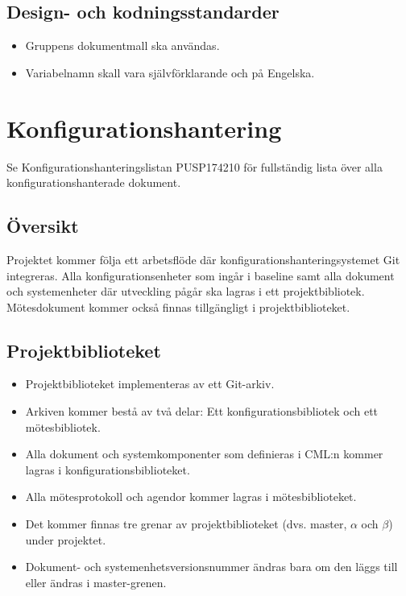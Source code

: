 \documentclass[paper=a4, fontsize=11pt,twoside]{article}
\begin{document}
\subsection*{Design- och kodningsstandarder}
	\begin{itemize}
	\item Gruppens dokumentmall ska användas.
	\item Variabelnamn skall vara självförklarande och på Engelska.
\end{itemize}



\section{Konfigurationshantering}

Se Konfigurationshanteringslistan PUSP174210 för fullständig lista över alla konfigurationshanterade dokument.

\subsection*{Översikt}
Projektet kommer följa ett arbetsflöde där konfigurationshanteringsystemet Git
integreras. Alla konfigurationsenheter som ingår i baseline samt alla dokument och systemenheter där utveckling pågår ska lagras i ett projektbibliotek. Mötesdokument kommer också finnas tillgängligt i projektbiblioteket.
 
\subsection*{Projektbiblioteket}
\begin{itemize}
\item Projektbiblioteket implementeras av ett Git-arkiv.
\item Arkiven kommer bestå av två delar: Ett konfigurationsbibliotek och ett mötesbibliotek.
\item Alla dokument och systemkomponenter som definieras i CML:n kommer lagras i konfigurationsbiblioteket.
\item Alla mötesprotokoll och agendor kommer lagras i mötesbiblioteket.
\item Det kommer finnas tre grenar av projektbiblioteket (dvs. master,
  $\alpha$ och $\beta$) under projektet.
\item Dokument- och systemenhetsversionsnummer ändras bara om den läggs till
eller ändras i master-grenen.
\end{itemize}
\end{document}
